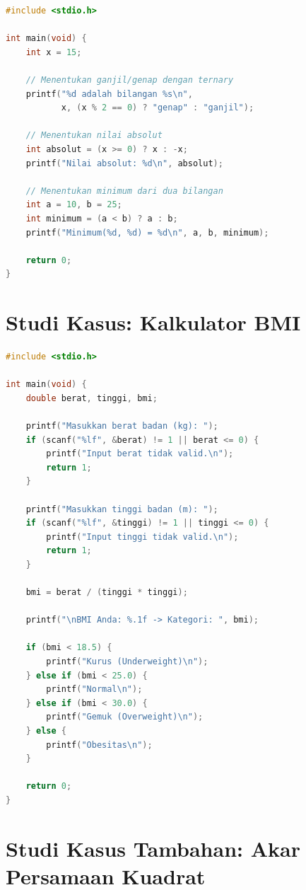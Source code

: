 \documentclass[../main.tex]{subfiles}
\begin{document}
\begin{lstlisting}[language=C,caption=Operator ternary dalam konteks]
#include <stdio.h>

int main(void) {
    int x = 15;
    
    // Menentukan ganjil/genap dengan ternary
    printf("%d adalah bilangan %s\n",
           x, (x % 2 == 0) ? "genap" : "ganjil");
    
    // Menentukan nilai absolut
    int absolut = (x >= 0) ? x : -x;
    printf("Nilai absolut: %d\n", absolut);
    
    // Menentukan minimum dari dua bilangan
    int a = 10, b = 25;
    int minimum = (a < b) ? a : b;
    printf("Minimum(%d, %d) = %d\n", a, b, minimum);
    
    return 0;
}
\end{lstlisting}

\section{Studi Kasus: Kalkulator BMI}

\begin{lstlisting}[language=C,caption=Kalkulator Body Mass Index]
#include <stdio.h>

int main(void) {
    double berat, tinggi, bmi;
    
    printf("Masukkan berat badan (kg): ");
    if (scanf("%lf", &berat) != 1 || berat <= 0) {
        printf("Input berat tidak valid.\n");
        return 1;
    }
    
    printf("Masukkan tinggi badan (m): ");
    if (scanf("%lf", &tinggi) != 1 || tinggi <= 0) {
        printf("Input tinggi tidak valid.\n");
        return 1;
    }
    
    bmi = berat / (tinggi * tinggi);
    
    printf("\nBMI Anda: %.1f -> Kategori: ", bmi);
    
    if (bmi < 18.5) {
        printf("Kurus (Underweight)\n");
    } else if (bmi < 25.0) {
        printf("Normal\n");
    } else if (bmi < 30.0) {
        printf("Gemuk (Overweight)\n");
    } else {
        printf("Obesitas\n");
    }
    
    return 0;
}
\end{lstlisting}

\section{Studi Kasus Tambahan: Akar Persamaan Kuadrat}
\end{document}
